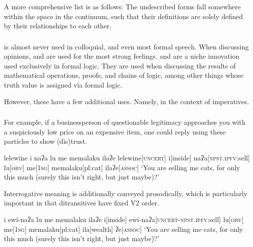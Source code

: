 A more comprehensive list is as follows:  The undescribed forms fall somewhere within the space in the continuum, such that their definitions are solely defined by their relationships to each other.

\subsubsection{}
 is almost never used in colloquial, and even most formal speech.
When discussing opinions,  and  are used for the most strong feelings.
 and  are a niche innovation used exclusively in formal logic.
They are used when discussing the results of mathematical operations, proofs, and chains of logic, among other things whose truth value is assigned via formal logic.

However, these have a few additional uses.
Namely, in the context of imperatives.

\subsubsection{}
For example, if a businessperson of questionable legitimacy approaches you with a suspiciously low price on an expensive item, one could reply using these particles to show (dis)trust.

\ex
\begingl
\glpreamble lelewine i naʔa lu me memalaku ilaʔe
\endpreamble
lelewine[\textsc{uncert}]
i[inside]
naʔa[\textsc{npst.ipfv:}sell]
lu[\textsc{obv}]
me[\textsc{1sg}]
memalaku[pl:cat]
ila\footnotemark[wealth]
ʔe[\textsc{assoc}]
\glft `You are selling me cats, for only this much (surely this isn't right, but just maybe)?'
\endgl
\xe

Interrogative meaning is additionally conveyed prosodically, which is particularly important in that ditransitives have fixed V2 order.


\begingl
\glpreamble i ewi-naʔa lu me memalaku ilaʔe
\endpreamble
i[inside]
ewi-naʔa[\textsc{uncert-npst.ipfv:}sell]
lu[\textsc{obv}]
me[\textsc{1sg}]
memalaku[pl:cat]
ila[wealth]
ʔe[\textsc{assoc}]
\glft `You are selling me cats, for only this much (surely this isn't right, but just maybe)?'
\endgl
\xe

